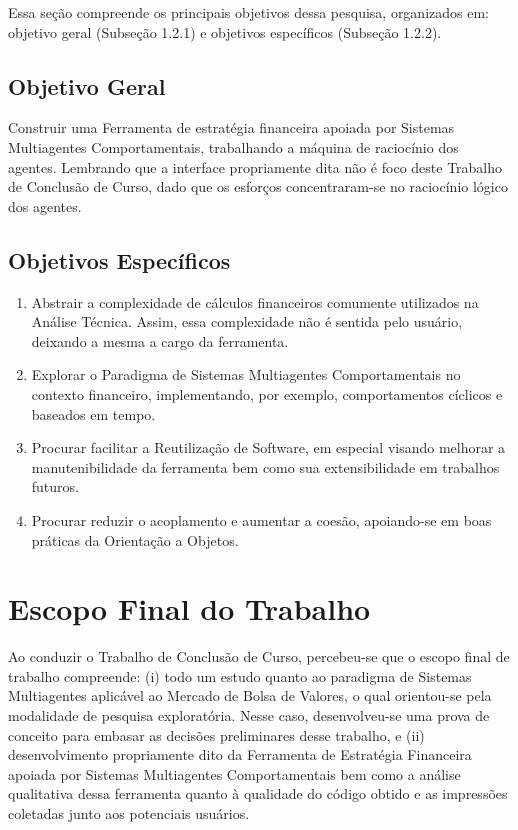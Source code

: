 Essa seção compreende os principais objetivos dessa pesquisa, organizados em: objetivo geral (Subseção 1.2.1) e objetivos específicos (Subseção 1.2.2).


\subsection {Objetivo Geral}

Construir uma Ferramenta de estratégia financeira apoiada por Sistemas Multiagentes Comportamentais, trabalhando a máquina de raciocínio dos agentes. Lembrando que a interface propriamente dita não é foco deste Trabalho de Conclusão de Curso, dado que os esforços  concentraram-se no raciocínio lógico dos agentes.


\subsection {Objetivos Específicos}

\begin{enumerate}
\item Abstrair a complexidade de cálculos financeiros comumente utilizados na Análise Técnica. Assim, essa complexidade não é sentida pelo usuário, deixando a mesma a cargo da ferramenta.
\item Explorar o Paradigma de Sistemas Multiagentes Comportamentais no contexto financeiro, implementando, por exemplo, comportamentos cíclicos e baseados em tempo.
\item Procurar facilitar a Reutilização de Software, em especial visando melhorar a manutenibilidade da ferramenta bem como sua extensibilidade em trabalhos futuros.
\item Procurar reduzir o acoplamento e aumentar a coesão, apoiando-se em boas práticas da Orientação a Objetos.
\end{enumerate}

\section{Escopo Final do Trabalho}

Ao conduzir o Trabalho de Conclusão de Curso, percebeu-se que o escopo final de trabalho compreende: (i) todo um estudo quanto ao paradigma de Sistemas Multiagentes aplicável ao Mercado de Bolsa de Valores, o qual orientou-se pela modalidade de pesquisa exploratória. Nesse caso, desenvolveu-se uma prova de conceito para embasar as decisões preliminares desse trabalho, e (ii) desenvolvimento propriamente dito da Ferramenta de Estratégia Financeira apoiada por Sistemas Multiagentes Comportamentais bem como a análise qualitativa dessa ferramenta quanto à qualidade do código obtido e as impressões coletadas junto aos potenciais usuários. 

